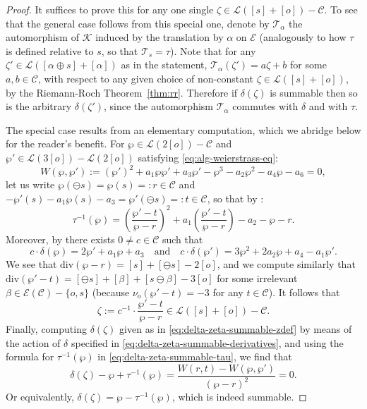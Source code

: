 \documentclass[preprint,12pt]{elsarticle}
\numberwithin{equation}{section} %
\theoremstyle{theorem}
\theoremstyle{definition}
\newcommand{\Ca}{\mathcal{C}} %
\newcommand{\bk}{\mathcal{K}} %
\newcommand{\ec}{\mathcal{E}} %
\newcommand{\idec}{{o}} %
\begin{document}
\begin{proof}  It suffices to prove this for any one single $\zeta\in\mathcal{L}([s]+[\idec])-\Ca$. To see that the general case follows from this special one, denote by $\mathcal{T}_\alpha$ the automorphism of $\bk$ induced by the translation by $\alpha$ on $\ec$ (analogously to how $\tau$ is defined relative to $s$, so that $\mathcal{T}_s=\tau$). Note that for any $\zeta'\in\mathcal{L}([\alpha\oplus s]+[\alpha])$ as in the statement, $\mathcal{T}_\alpha(\zeta')=a\zeta+b$ for some $a,b\in\Ca$, with respect to any given choice of non-constant $\zeta\in\mathcal{L}([s]+[\idec])$, by the Riemann-Roch Theorem~\ref{thm:rr}. Therefore if $\delta(\zeta)$ is summable then so is the arbitrary $\delta(\zeta')$, since the automorphism $\mathcal{T}_\alpha$ commutes with $\delta$ and with $\tau$.

The special case results from an elementary computation, which we abridge below for the reader's benefit. For $\wp\in\mathcal{L}(2[\idec])-\Ca$ and $\wp'\in\mathcal{L}(3[\idec])-\mathcal{L}(2[\idec])$ satisfying \eqref{eq:alg-weierstrass-eq}:\begin{equation}\label{eq:delta-zeta-weierstrass}W(\wp,\wp'):=(\wp')^2+a_1\wp\wp'+a_3\wp'-\wp^3-a_2\wp^2-a_4\wp-a_6=0,\end{equation} let us write $\wp(\ominus s)=\wp( s)=:r\in\Ca$ and $-\wp'(s)-a_1\wp(s)-a_3=\wp'(\ominus s)=:t\in\Ca$, so that by \cite[\S III.2]{SilvermanIntro}: \begin{equation}\label{eq:delta-zeta-summable-tau}\tau^{-1}(\wp)=\left(\frac{\wp'-t}{\wp-r}\right)^2 +a_1\left(\frac{\wp'-t}{\wp-r}\right)-a_2-\wp-r.\end{equation}
Moreover, by \cite[Thm.~A1.1]{LangElliptic} there exists $0\neq c\in\Ca$ such that \begin{equation}\label{eq:delta-zeta-summable-derivatives}c\cdot\delta(\wp)=2\wp'+a_1\wp+a_3\quad\text{and}\quad c\cdot\delta(\wp')=3\wp^2+2a_2\wp+a_4-a_1\wp'.\end{equation}
We see that $\mathrm{div}(\wp-r)=[s]+[\ominus s]-2[\idec]$, and we compute similarly that $\mathrm{div}(\wp'-t)=[\ominus s]+[\beta]+[s\ominus\beta]-3[\idec]$ for some irrelevant $\beta\in\ec(\Ca)-\{\idec,s\}$ (because $\nu_\idec(\wp'-t)=-3$ for any $t\in\Ca$). It follows that \begin{equation}\label{eq:delta-zeta-summable-zdef}\zeta:=c^{-1}\cdot\frac{\wp'-t}{\wp-r}\in\mathcal{L}([s]+[\idec])-\Ca.\end{equation} Finally, computing $\delta(\zeta)$ given as in \eqref{eq:delta-zeta-summable-zdef} by means of the action of $\delta$ specified in \eqref{eq:delta-zeta-summable-derivatives}, and using the formula for $\tau^{-1}(\wp)$ in \eqref{eq:delta-zeta-summable-tau}, we find that \[\delta(\zeta)-\wp+\tau^{-1}(\wp)=\frac{W(r,t)-W(\wp,\wp')}{(\wp-r)^2}=0.\]
Or equivalently, $\delta(\zeta)=\wp-\tau^{-1}(\wp)$, which is indeed summable.\end{proof}
\end{document}
